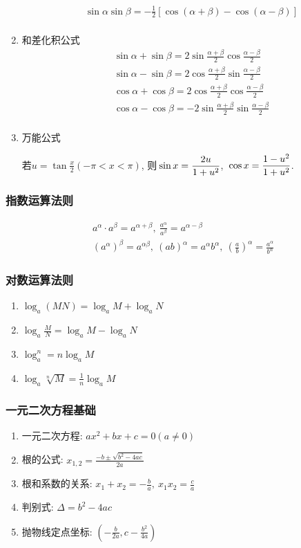\begin{enumerate}
\[\begin{split}
& \sin\alpha\sin\beta = -\frac{1}{2}[\cos(\alpha + \beta) - \cos(\alpha - \beta)] \\
\end{split} \]
\item 和差化积公式
\[ \begin{split}
& \sin\alpha + \sin\beta = 2\sin\frac{\alpha+\beta}{2}\cos\frac{\alpha - \beta}{2} \\
& \sin\alpha - \sin\beta = 2\cos\frac{\alpha+\beta}{2}\sin\frac{\alpha - \beta}{2} \\
& \cos\alpha + \cos\beta = 2\cos\frac{\alpha+\beta}{2}\cos\frac{\alpha - \beta}{2} \\
& \cos\alpha - \cos\beta = -2\sin\frac{\alpha+\beta}{2}\sin\frac{\alpha - \beta}{2} \\
\end{split} \]
\item 万能公式\par
若$ u=\tan \frac{x}{2}(-\pi<x<\pi) $, 则$ \displaystyle\hspace{.2em}\sin x=\frac{2u}{1+u^{2}} $, $ \displaystyle\hspace{.2em}\cos x=\frac{1-u^{2}}{1+u^{2}} $.
\end{enumerate}
\subsubsection{指数运算法则}
\vspace*{-2em}
\[ \begin{split}
& a^{\alpha}\cdot a^{\beta}=a^{\alpha + \beta},\  \frac{a^{\alpha}}{a^{\beta}}=a^{\alpha-\beta} \\
& (a^{\alpha})^{\beta}=a^{\alpha \beta},\ (ab)^{\alpha}=a^{\alpha}b^{\alpha},\ (\frac{a}{b})^{\alpha}=\frac{a^{\alpha}}{b^{\alpha}}
\end{split} \]
\subsubsection{对数运算法则}
\begin{enumerate}
\item $ \log_{a}(MN)=\log_{a}M+\log_{a}N  $
\item $ \log_{a}\frac{M}{N}=\log_{a}M-\log_{a}N $
\item $ \log_{a}^{n}=n\log_{a}M $
\item $ \log_{a}\sqrt[n]{M}=\frac{1}{n}\log_{a}M $
\end{enumerate}
\subsubsection{一元二次方程基础}
\begin{enumerate}
\item 一元二次方程: $ ax^{2}+bx+c=0(a\neq 0) $
\item 根的公式: $ x_{1,2}=\frac{-b\pm \sqrt{b^{2}-4ac}}{2a} $
\item 根和系数的关系: $ x_{1}+x_{2}=-\frac{b}{a},\ x_{1}x_{2}=\frac{c}{a} $
\item 判别式: $ \Delta=b^{2}-4ac $
\item 抛物线定点坐标: $ (-\frac{b}{2a},c-\frac{b^{2}}{4a}) $
\end{enumerate}
